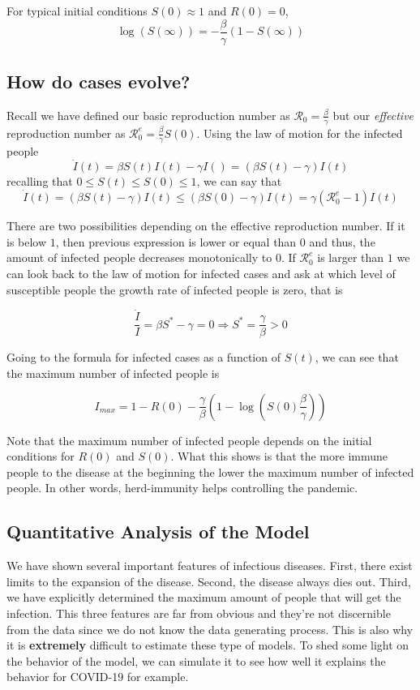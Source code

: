 \documentclass[a4paper,11pt]{article}
\theoremstyle{definition}
\theoremstyle{plain}
\begin{document}
For typical initial conditions \(S(0) \approx 1\) and \(R(0) = 0\), 
\[
\log(S(\infty)) = - \frac{\beta}{\gamma}(1 - S(\infty))
\]

\subsection{How do cases evolve?}\label{how-do-cases-evolve}
Recall we have defined our basic reproduction number as
\(\mathcal{R}_0 = \frac{\beta}{\gamma}\) but our \emph{effective} reproduction number as \(\mathcal{R}^e_0 = \frac{\beta}{\gamma} S(0)\). Using the law of motion for the infected people \[
\dot{I}(t) = \beta S(t)I(t) - \gamma I( ) = (\beta S(t) - \gamma)I(t) \] recalling that \(0 \leq S(t) \leq S(0) \leq 1\), we can say that \[ \dot{I}(t) = (\beta S(t) - \gamma)I(t) \leq (\beta S(0) - \gamma)I(t) = \gamma (\mathcal{R}^e_0 - 1)I(t)
\]  

There are two possibilities depending on the effective reproduction number. If it is below \(1\), then previous expression is lower or equal than  \(0\) and thus, the amount of infected people decreases monotonically to \(0\). If \(\mathcal{R}^e_0\) is larger than \(1\) we can look back to the law of motion for infected cases and ask at which level of susceptible people the growth rate of infected people is zero, that is

\[
\frac{\dot{I}}{I} = \beta S^* - \gamma = 0 \Rightarrow S^* = \frac{\gamma}{\beta} > 0
\]

Going to the formula for infected cases as a function of \(S(t)\), we
can see that the maximum number of infected people is

\[
I_{max} = 1 - R(0) - \frac{\gamma}{\beta}\left(1 - \log\left(S(0)\frac{\beta}{\gamma}\right)\right)
\]

Note that the maximum number of infected people depends on the initial conditions for $R(0)$ and $S(0)$. What this shows is that the more immune people to the disease at the beginning the lower the maximum number of infected people. In other words, herd-immunity helps controlling the pandemic.

\subsection{Quantitative Analysis of the Model}\label{quantitative-analysis-of-the-model}

We have shown several important features of infectious diseases. First, there exist limits to the expansion of the disease. Second, the disease always dies out. Third, we have explicitly determined the maximum amount of people that will get the infection. This three features are far from obvious and they're not discernible from the data since we do not know the data generating process. This is also why it is \textbf{extremely} difficult to estimate these type of models.
 To shed some light on the behavior of the model, we can simulate it to see how well it explains the behavior for COVID-19 for example. 
       
\end{document}

